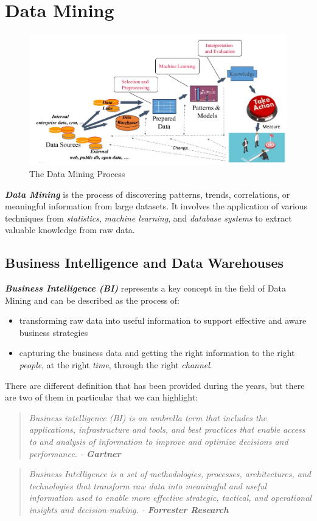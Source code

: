 \chapter{Data Mining}
\begin{figure}[ht!]
    \centering
    \includegraphics[scale=0.6]{images/Data_Mining_process.jpg}
    \caption{The Data Mining Process}
\end{figure}

\textbf{\textit{Data Mining}} is the process of discovering patterns, trends, correlations, or meaningful information from large datasets. It involves the application of various techniques from \textit{statistics}, \textit{machine learning}, and \textit{database systems} to extract valuable knowledge from raw data.

\section{Business Intelligence and Data Warehouses}

\textbf{\textit{Business Intelligence (BI)}} represents a key concept in the field of Data Mining and can be described as the process of:
\begin{itemize}
    \item transforming raw data into useful information to support effective and aware business strategies
    \item capturing the business data and getting the right information to the right \textit{people}, at the right \textit{time}, through the right \textit{channel}.
\end{itemize}
There are different definition that has been provided during the years, but there are two of them in particular that we can highlight:
\begin{quote}
    \textit{Business intelligence (BI) is an umbrella term that includes the applications, infrastructure and tools, and best practices that enable access to and analysis of information to improve and optimize decisions and performance. - \textbf{Gartner}}
\end{quote}
\begin{quote}
    \textit{Business Intelligence is a set of methodologies, processes, architectures, and technologies that transform raw data into meaningful and useful information used to enable more effective strategic, tactical, and operational insights and decision-making. - \textbf{Forrester Research}}
\end{quote}

